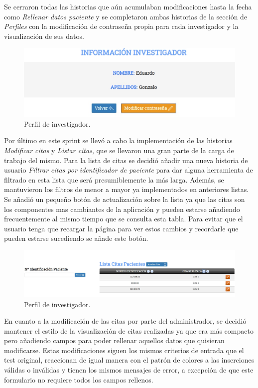 Se cerraron todas las historias que aún acumulaban modificaciones hasta la fecha como \textit{Rellenar datos paciente} y se completaron ambas historias de la sección de \textit{Perfiles} con la modificación de contraseña propia para cada investigador y la visualización de sus datos.

\begin{figure}[h]
    \centering
     \includegraphics[width=14.cm,height=4.cm]{images/perfil.jpg}
    \caption{Perfil de investigador.}
\end{figure}
\newpage

Por último en este sprint se llevó a cabo la implementación de las historias \textit{Modificar citas} y \textit{Listar citas}, que se llevaron una gran parte de la carga de trabajo del mismo. Para la lista de citas se decidió añadir una nueva historia de usuario \textit{Filtrar citas por identificador de paciente} para dar alguna herramienta de filtrado en esta lista que será presumiblemente la más larga. Además, se mantuvieron los filtros de menor a mayor ya implementados en anteriores listas. Se añadió un pequeño botón de actualización sobre la lista ya que las citas son los componentes mas cambiantes de la aplicación y pueden estarse añadiendo frecuentemente al mismo tiempo que se consulta esta tabla. Para evitar que el usuario tenga que recargar la página para ver estos cambios y recordarle que pueden estarse sucediendo se añade este botón.

\begin{figure}[h]
    \centering
     \includegraphics[width=1\textwidth]{images/listarCitas.jpg}
    \caption{Perfil de investigador.}
\end{figure}

En cuanto a la modificación de las citas por parte del administrador, se decidió mantener el estilo de la visualización de citas realizadas ya que era más compacto pero añadiendo campos para poder rellenar aquellos datos que quisieran modificarse. Estas modificaciones siguen los mismos criterios de entrada que el test original, reaccionan de igual manera con el patrón de colores a las inserciones válidas o inválidas y tienen los mismos mensajes de error, a excepción de que este formulario no requiere todos los campos rellenos.

